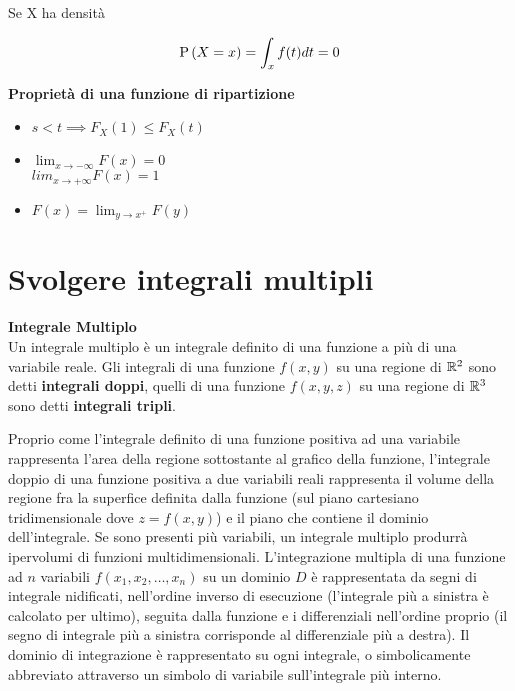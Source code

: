 \begin{note}
    Se X ha densità

    \begin{equation*}
        \text{P}\left(X = x\right) = \int_x f(t) dt = 0
    \end{equation*}
\end{note}

\begin{defn}
    \textbf{Proprietà di una funzione di ripartizione} \\
    \begin{itemize}
        \item $s < t \implies F_X(1) \leq F_X(t)$ %
        \item $\lim_{x \to -\infty} F(x) = 0$ \\
            $lim_{x \to +\infty} F(x) = 1$
        \item $F(x) = \lim_{y \to x^+} F(y)$
    \end{itemize}
\end{defn}

\section{Svolgere integrali multipli}
\begin{defn}
    \textbf{Integrale Multiplo} \\
    Un integrale multiplo è un integrale definito di una funzione a più di una
    variabile reale. Gli integrali di una funzione $f(x,y)$ su una regione di $ \mathbb{R}^2 $ sono detti
    \textbf{integrali doppi}, quelli di una funzione $f(x,y,z)$ su una regione di $ \mathbb{R}^3 $ sono detti \textbf{integrali tripli}.

    Proprio come l'integrale definito di una funzione positiva ad una variabile rappresenta
    l'area della regione sottostante al grafico della funzione, l'integrale doppio di
    una funzione positiva a due variabili reali rappresenta il volume della regione fra la superfice definita
    dalla funzione (sul piano cartesiano tridimensionale dove $ z = f(x, y)$) e il piano che contiene il dominio dell'integrale.
    Se sono presenti più variabili, un integrale multiplo produrrà ipervolumi di funzioni multidimensionali.
    L'integrazione multipla di una funzione ad $n$ variabili $f(x_1, x_2, \hdots, x_n)$ su un dominio $D$ è rappresentata
    da segni di integrale nidificati, nell'ordine inverso di esecuzione (l'integrale più a sinistra è calcolato per ultimo),
    seguita dalla funzione e i differenziali nell'ordine proprio (il segno di integrale più a sinistra corrisponde al differenziale
    più a destra). Il dominio di integrazione è rappresentato su ogni integrale, o simbolicamente abbreviato attraverso un simbolo
    di variabile sull'integrale più interno.
\end{defn}


